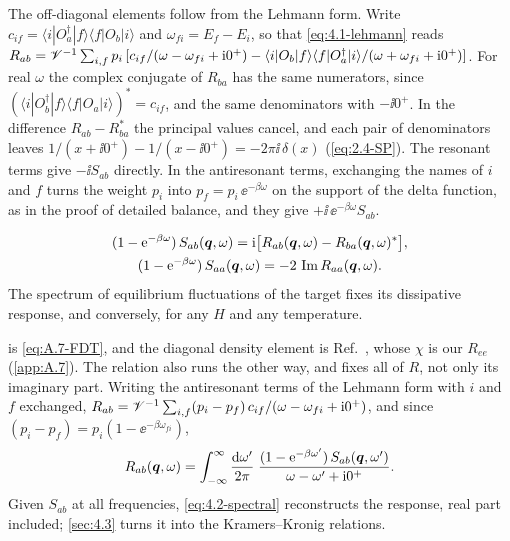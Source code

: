 The off-diagonal elements follow from the Lehmann form. Write $c_{if} = \langle i|O_a^\dagger|f\rangle\langle f|O_b|i\rangle$ and $\omega_{fi} = E_f - E_i$, so that \cref{eq:4.1-lehmann} reads $R_{ab} = \mathscr{V}^{-1}\sum_{i,f}p_i\,[c_{if}/(\omega - \omega_{fi} + \mathrm{i}0^+) - \langle i|O_b|f\rangle\langle f|O_a^\dagger|i\rangle/(\omega + \omega_{fi} + \mathrm{i}0^+)]$. For real $\omega$ the complex conjugate of $R_{ba}$ has the same numerators, since $(\langle i|O_b^\dagger|f\rangle\langle f|O_a|i\rangle)^* = c_{if}$, and the same denominators with $-\ii0^+$. In the difference $R_{ab} - R_{ba}^*$ the principal values cancel, and each pair of denominators leaves $1/(x + \ii0^+) - 1/(x - \ii0^+) = -2\pi\ii\,\delta(x)$ (\cref{eq:2.4-SP}). The resonant terms give $-\ii S_{ab}$ directly. In the antiresonant terms, exchanging the names of $i$ and $f$ turns the weight $p_i$ into $p_f = p_i\,\ee^{-\beta\omega}$ on the support of the delta function, as in the proof of detailed balance, and they give $+\ii\,\ee^{-\beta\omega}S_{ab}$.
\begin{keyresult}
\begin{equation}
  \begin{gathered}
  (1 - \mathrm{e}^{-\beta\omega})\,S_{ab}(\bm{q},\omega) = \mathrm{i}\bigl[R_{ab}(\bm{q},\omega) - R_{ba}(\bm{q},\omega)^*\bigr], \\
  (1 - \mathrm{e}^{-\beta\omega})\,S_{aa}(\bm{q},\omega) = -2\,\operatorname{Im} R_{aa}(\bm{q},\omega) .
  \end{gathered}
  \label{eq:4.2-fdt}
\end{equation}
The spectrum of equilibrium fluctuations of the target fixes its dissipative response, and conversely, for any $H$ and any temperature.
\end{keyresult}
 is \cref{eq:A.7-FDT}, and the diagonal density element is Ref.~\cite[Eq.~(3)]{knapen2021dark}, whose $\chi$ is our $R_{ee}$ (\cref{app:A.7}). The relation also runs the other way, and fixes all of $R$, not only its imaginary part. Writing the antiresonant terms of the Lehmann form with $i$ and $f$ exchanged, $R_{ab} = \mathscr{V}^{-1}\sum_{i,f}(p_i - p_f)\,c_{if}/(\omega - \omega_{fi} + \mathrm{i}0^+)$, and since $(p_i - p_f) = p_i(1 - \ee^{-\beta\omega_{fi}})$,
\begin{equation}
  R_{ab}(\bm{q},\omega) = \int_{-\infty}^{\infty}\frac{\mathrm{d}\omega'}{2\pi}\;\frac{(1 - \mathrm{e}^{-\beta\omega'})\,S_{ab}(\bm{q},\omega')}{\omega - \omega' + \mathrm{i}0^+} .
  \label{eq:4.2-spectral}
\end{equation}
Given $S_{ab}$ at all frequencies, \cref{eq:4.2-spectral} reconstructs the response, real part included; \cref{sec:4.3} turns it into the Kramers--Kronig relations.

